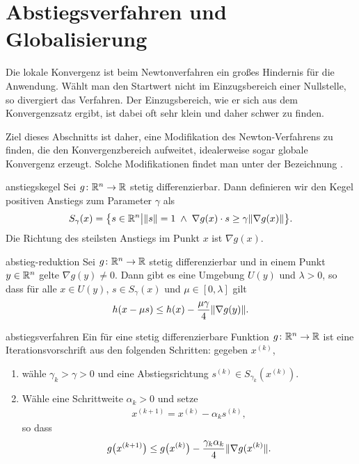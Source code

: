 \section{Abstiegsverfahren und Globalisierung}

\begin{intro}
  Die lokale Konvergenz ist beim Newtonverfahren ein großes Hindernis
  für die Anwendung. Wählt man den Startwert nicht im Einzugsbereich
  einer Nullstelle, so divergiert das Verfahren. Der Einzugsbereich,
  wie er sich aus dem Konvergenzsatz ergibt, ist dabei oft sehr klein
  und daher schwer zu finden.

  Ziel dieses Abschnitts ist daher, eine Modifikation des
  Newton-Verfahrens zu finden, die den Konvergenzbereich aufweitet,
  idealerweise sogar globale Konvergenz erzeugt. Solche Modifikationen
  findet man unter der Bezeichnung .
\end{intro}

\begin{Definition}{anstiegskegel}
  Sei $g\colon \mathbb R^n\to \mathbb R$ stetig differenzierbar. Dann definieren wir
  den Kegel positiven Anstiegs zum Parameter $\gamma$ als
  \begin{gather}
    S_\gamma(x) = \bigl\{ s\in\mathbb R^n \big|
    \lVert s\rVert = 1 \;\wedge \;
    \nabla g(x)\cdot s \ge \gamma\lVert\nabla g(x)\rVert
    \bigr\}.
  \end{gather}
  Die Richtung des steilsten Anstiegs im Punkt $x$ ist $\nabla g(x)$.
\end{Definition}

\begin{Lemma}{abstieg-reduktion}
  Sei $g\colon\mathbb R^n\to\mathbb R$ stetig differenzierbar und in einem Punkt
  $y\in\mathbb R^n$ gelte $\nabla g(y) \neq 0$. Dann gibt es eine Umgebung
  $U(y)$ und $\lambda>0$, so dass für alle $x\in U(y)$,
  $s\in S_\gamma(x)$ und $\mu\in [0,\lambda]$ gilt
  \begin{gather}
    h(x-\mu s) \le h(x) - \frac{\mu\gamma}4 \lVert\nabla g(y)\rVert.
  \end{gather}
\end{Lemma}

\begin{Definition}{abstiegsverfahren}
  Ein  für eine stetig differenzierbare
  Funktion $g\colon \mathbb R^n\to\mathbb R$ ist eine Iterationsvorschrift aus den
  folgenden Schritten: gegeben $x^{(k)}$,
  \begin{enumerate}
  \item wähle $\gamma_k>\gamma>0$ und eine Abstiegsrichtung
    $s^{(k)} \in S_{\gamma_k}(x^{(k)})$.
  \item Wähle eine Schrittweite $\alpha_k>0$ und setze
    \begin{gather}
      x^{(k+1)} = x^{(k)} - \alpha_k s^{(k)},
    \end{gather}
    so dass
    \begin{gather}
      \label{eq:newton:7}
      g\bigl(x^{(k+1)}\bigr)
      \le g\bigl(x^{(k)}\bigr) - \frac{\gamma_k\alpha_k}{4}\lVert\nabla g(x^{(k)}\rVert.
    \end{gather}
  \end{enumerate}
\end{Definition}

